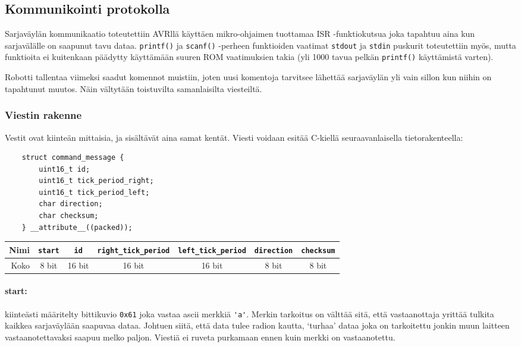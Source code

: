 \documentclass[]{article} %
\numberwithin{equation}{section}
\numberwithin{figure}{section}
\numberwithin{table}{section}
\begin{document}
\subsection{Kommunikointi protokolla}
\label{sec:Kommunikointi protokilla}

Sarjaväylän kommunikaatio toteutettiin AVRllä käyttäen mikro-ohjaimen tuottamaa ISR -funktiokutsua joka tapahtuu aina kun sarjavälälle on saapunut tavu dataa. \verb+printf()+ ja \verb+scanf()+ -perheen funktioiden vaatimat \verb+stdout+ ja \verb+stdin+ puskurit toteutettiin myös, mutta funktioita ei kuitenkaan päädytty käyttämään suuren ROM vaatimuksien takia (yli 1000 tavua pelkän \verb+printf()+ käyttämistä varten).

Robotti tallentaa viimeksi saadut komennot muistiin, joten uusi komentoja tarvitsee lähettää sarjaväylän yli vain sillon kun niihin on tapahtunut muutos. Näin vältytään toistuvilta samanlaisilta viesteiltä.

\subsubsection{Viestin rakenne}
\label{sub:Viestin rakenne}


Vestit ovat kiinteän mittaisia, ja sisältävät aina samat kentät. Viesti voidaan esitää C-kiellä seuraavanlaisella tietorakenteella:


\begin{verbatim}
    struct command_message {
        uint16_t id;
        uint16_t tick_period_right;
        uint16_t tick_period_left;
        char direction;
        char checksum;
    } __attribute__((packed));
\end{verbatim}

\begin{center}
\begin{tabular}{|r|c|c|c|c|c|c|}
    \hline
    Nimi & \verb+start+ & \verb+id+ & \verb+right_tick_period+ & \verb+left_tick_period+ & \verb+direction+ & \verb+checksum+ \\
    \hline
    Koko & 8 bit & 16 bit & 16 bit & 16 bit & 8 bit & 8 bit\\
    \hline
\end{tabular}
\end{center}


\paragraph{start:} kiinteästi määritelty bittikuvio \verb+0x61+ joka vastaa ascii merkkiä \verb+'a'+. Merkin tarkoitus on välttää sitä, että vastaanottaja yrittää tulkita kaikkea sarjaväylään saapuvaa dataa. Johtuen siitä, että data tulee radion kautta, `turhaa' dataa joka on tarkoitettu jonkin muun laitteen vastaanotettavaksi saapuu melko paljon. Viestiä ei ruveta purkamaan ennen kuin merkki on vastaanotettu.
\end{document}
